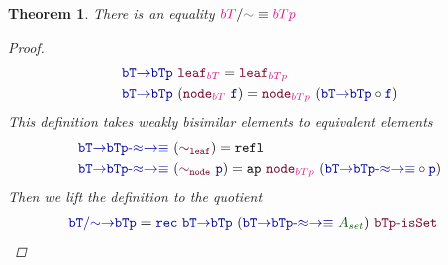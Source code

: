 \documentclass[twoside,11pt,openright]{report}
\theoremstyle{plain} %
\newtheorem{thm}{Theorem}[section]
\theoremstyle{definition}
\theoremstyle{remark}
\newcommand*{\term}[1]{\textcolor{green!30!black}{#1}} %
\newcommand*{\type}[1]{\textcolor{magenta!90!black}{#1}}
\newcommand*{\relation}[1]{\textcolor{gray!75!black}{\ensuremath{\mathtt{#1}}}}
\newcommand*{\function}[1]{\textcolor{blue!60!black}{\ensuremath{\mathtt{#1}}}}
\newcommand*{\constructor}[1]{\textcolor{purple!60!black}{\ensuremath{\mathtt{#1}}}}
\begin{document}
\begin{thm}
  There is an equality \(\type{bT}/\relation{\sim} \equiv \type{bTp}\)
  \begin{proof}
    \begin{equation}
      \begin{aligned}
        &\function{bT{\rightarrow}bTp}~\constructor{leaf}_{\type{bT}} = \constructor{leaf}_{\type{bTp}} \\
        &\function{bT{\rightarrow}bTp}~(\constructor{node}_{\type{bT}}~\function{f}) = \constructor{node}_{\type{bTp}}~(\function{bT{\rightarrow}bTp} \circ \function{f})
      \end{aligned}
    \end{equation}
    This definition takes weakly bisimilar elements to equivalent elements
    \begin{equation}
      \begin{aligned}
        &\function{bT{\rightarrow}bTp\text{-}{\approx}{\rightarrow}{\equiv}}~(\constructor{\sim_{leaf}}) = \mathtt{refl} \\
        &\function{bT{\rightarrow}bTp\text{-}{\approx}{\rightarrow}{\equiv}}~(\constructor{\sim_{node}}~\function{p}) = \mathtt{ap}~\constructor{node}_{\type{bTp}}~(\function{bT{\rightarrow}bTp\text{-}{\approx}{\rightarrow}{\equiv}} \circ \function{p})
      \end{aligned}
    \end{equation}
    Then we lift the definition to the quotient
    \begin{equation}
      \begin{aligned}
        &\function{bT/{\sim}{\rightarrow}bTp} = \function{rec}~\function{bT{\rightarrow}bTp}~(\function{bT{\rightarrow}bTp\text{-}{\approx}{\rightarrow}{\equiv}}~\term{A_{set}})~\constructor{bTp\text{-}isSet}
      \end{aligned}
    \end{equation}
  \end{proof}
\end{thm}
\end{document}
